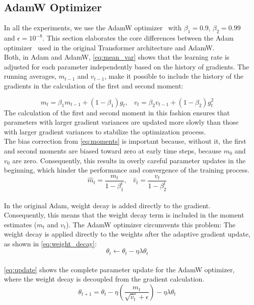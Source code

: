 \subsection{AdamW Optimizer}
In all the experiments, we use the AdamW optimizer~\cite{loshchilov2019decoupledweightdecayregularization} with \(\beta_1=0.9\), \(\beta_2=0.99\) and \(\epsilon=10^{-8}\).
This section elaborates the core differences between the Adam optimizer~\cite{kingma2017adammethodstochasticoptimization} used in the original Transformer architecture and AdamW.\\
Both, in Adam and AdamW, \cref{eq:mean_var} shows that the learning rate is adjusted for each parameter independently based on the history of gradients.
The running averages, \(m_{t-1}\) and \(v_{t-1}\), make it possible to include the history of the gradients in the calculation of the first and second moment:

\begin{equation}
\label{eq:mean_var}
m_t = \beta_1 m_{t-1} + (1 - \beta_1) g_t \text{,} \quad v_t = \beta_2 v_{t-1} + (1 - \beta_2) g_t^2
\end{equation}
The calculation of the first and second moment in this fashion ensures that parameters with larger gradient variances are updated more slowly than those with larger gradient variances to stabilize the optimization process. \\
The bias correction from \cref{eq:moments} is important because, without it, the first and second moments are biased toward zero at early time steps, because \(m_0\) and \(v_0\) are zero. Consequently, this results in overly careful parameter updates in the beginning, which hinder the performance and convergence of the training process. \\
\begin{equation}
\hat{m}_t = \frac{m_t}{1 - \beta_1^t} \text{,} \quad \hat{v}_t = \frac{v_t}{1 - \beta_2^t}
\label{eq:moments}
\end{equation}
\\
In the original Adam, weight decay is added directly to the gradient. Consequently, this means that the weight decay term is included in the moment estimates (\(m_t\) and \(v_t\)). The AdamW optimizer circumvents this problem: The weight decay is applied directly to the weights after the adaptive gradient update, as shown in \cref{eq:weight_decay}:
\begin{equation}
\label{eq:weight_decay}
\theta_t \leftarrow \theta_t - \eta \lambda \theta_t
\end{equation}
\\
\cref{eq:update} shows the complete parameter update for the AdamW optimizer, where the weight decay is decoupled from the gradient calculation.
\begin{equation}
\label{eq:update}
\theta_{t+1} = \theta_t - \eta \left( \frac{\hat{m}_t}{\sqrt{\hat{v}_t} + \epsilon} \right) - \eta \lambda \theta_t
\end{equation}




